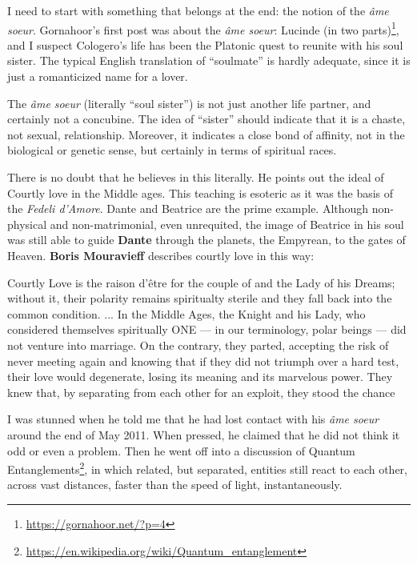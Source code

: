 I need to start with something that belongs at the end: the notion of the \emph{âme soeur}. Gornahoor's first post was about the \emph{âme soeur}: Lucinde (in two parts)\footnote{\url{https://gornahoor.net/?p=4}}, and I suspect Cologero's life has been the Platonic quest to reunite with his soul sister. The typical English translation of ``soulmate'' is hardly adequate, since it is just a romanticized name for a lover.

The \emph{âme soeur} (literally ``soul sister'') is not just another life partner, and certainly not a concubine. The idea of ``sister'' should indicate that it is a chaste, not sexual, relationship. Moreover, it indicates a close bond of affinity, not in the biological or genetic sense, but certainly in terms of spiritual races.

There is no doubt that he believes in this literally. He points out the ideal of Courtly love in the Middle ages. This teaching is esoteric as it was the basis of the \emph{Fedeli d'Amore}. Dante and Beatrice are the prime example. Although non-physical and non-matrimonial, even unrequited, the image of Beatrice in his soul was still able to guide \textbf{Dante} through the planets, the Empyrean, to the gates of Heaven. \textbf{Boris Mouravieff} describes courtly love in this way:

\begin{quotex}
Courtly Love is the raison d'être for the couple of and the Lady of his Dreams; without it, their polarity remains spiritualty sterile and they fall back into the common condition. ... In the Middle Ages, the Knight and his Lady, who considered themselves spiritually ONE --- in our terminology, polar beings --- did not venture into marriage. On the contrary, they parted, accepting the risk of never meeting again and knowing that if they did not triumph over a hard test, their love would degenerate, losing its meaning and its marvelous power. They knew that, by separating from each other for an exploit, they stood the chance
\end{quotex}


I was stunned when he told me that he had lost contact with his \emph{âme soeur} around the end of May 2011. When pressed, he claimed that he did not think it odd or even a problem. Then he went off into a discussion of Quantum Entanglements\footnote{\url{https://en.wikipedia.org/wiki/Quantum\_entanglement}}, in which related, but separated, entities still react to each other, across vast distances, faster than the speed of light, instantaneously.

